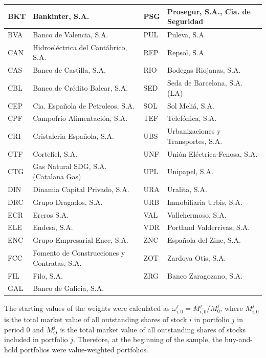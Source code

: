 \documentclass[10pt]{article}
\begin{document}
\begin{table}[h]
\begin{center}
\begin{tabular}{|l|l|l|l|}
\hline
BKT & Bankinter, S.A. & PSG & Prosegur, S.A., Cia. de Seguridad \\
\hline
BVA & Banco de Valencia, S.A. & PUL & Puleva, S.A. \\
\hline
CAN & Hidroeléctrica del Cantábrico, S.A. & REP & Repsol, S.A. \\
\hline
CAS & Banco de Castilla, S.A. & RIO & Bodegas Riojanas, S.A. \\
\hline
CBL & Banco de Crédito Balear, S.A. & SED & Seda de Barcelona, S.A. (LA) \\
\hline
CEP & Cia. Española de Petroleos, S.A. & SOL & Sol Meliá, S.A. \\
\hline
CPF & Campofrio Alimentación, S.A. & TEF & Telefónica, S.A. \\
\hline
CRI & Cristaleria Española, S.A. & UBS & Urbanizaciones y Transportes, S.A. \\
\hline
CTF & Cortefiel, S.A. & UNF & Unión Eléctrica-Fenosa, S.A. \\
\hline
CTG & Gas Natural SDG, S.A. (Catalana Gas) & UPL & Unipapel, S.A. \\
\hline
DIN & Dinamia Capital Privado, S.A. & URA & Uralita, S.A. \\
\hline
DRC & Grupo Dragados, S.A. & URB & Inmobiliaria Urbis, S.A. \\
\hline
ECR & Ercros S.A. & VAL & Vallehermoso, S.A. \\
\hline
ELE & Endesa, S.A. & VDR & Portland Valderrivas, S.A. \\
\hline
ENC & Grupo Empresarial Ence, S.A. & ZNC & Española del Zinc, S.A. \\
\hline
FCC & Fomento de Construcciones y Contratas, S.A. & ZOT & Zardoya Otis, S.A. \\
\hline
FIL & Filo, S.A. & ZRG & Banco Zaragozano, S.A. \\
\hline
GAL & Banco de Galicia, S.A. &  &  \\
\hline
\end{tabular}
\end{center}
\end{table}

The starting values of the weights were calculated as $\omega_{i, 0}^{j}=M_{i, 0}^{j} / M_{0}^{j}$, where $M_{i, 0}^{j}$ is the total market value of all outstanding shares of stock $i$ in portfolio $j$ in period 0 and $M_{\mathrm{O}}^{j}$ is the total market value of all outstanding shares of stocks included in portfolio $j$. Therefore, at the beginning of the sample, the buy-and-hold portfolios were value-weighted portfolios.
\end{document}
